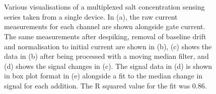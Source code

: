 \documentclass[
  a4paper,
]{scrbook}
\begin{document}
\begin{figure}
\begin{minipage}[t]{0.50\linewidth}
{{}

}

\subcaption{\label{fig-salt-conc-signal}}
\end{minipage}%
\newline
\begin{minipage}[t]{0.25\linewidth}

{\centering 

~

}

\end{minipage}%
%
\begin{minipage}[t]{0.50\linewidth}

{\centering 


}

\subcaption{\label{fig-salt-conc-box-plot}}
\end{minipage}%
%
\begin{minipage}[t]{0.25\linewidth}

{\centering 

~

}

\end{minipage}%

\caption{\label{fig-salt-conc-sensing}Various visualisations of a
multiplexed salt concentration sensing series taken from a single
device. In (a), the raw current measurements for each channel are shown
alongside gate current. The same measurements after despiking, removal
of baseline drift and normalisation to initial current are shown in (b),
(c) shows the data in (b) after being processed with a moving median
filter, and (d) shows the signal changes in (c). The signal data in (d)
is shown in box plot format in (e) alongside a fit to the median change
in signal for each addition. The R squared value for the fit was 0.86.}

\end{figure}
\end{document}
